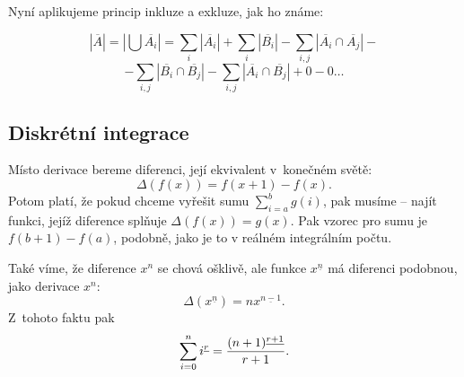 Nyní aplikujeme princip inkluze a exkluze, jak ho známe:

$$|\overline{A}| = |⋃\overline{A_i}| = ∑_i |\overline{A_i}| + ∑_i |\overline{B_i}| - ∑_{i,j}|\overline{A_i} ∩ \overline{A_j}| -$$
$$ - ∑_{i,j} |\overline{B_i} ∩ \overline{B_j}| - ∑_{i,j}|\overline{A_i} ∩ \overline{B_j}| + 0 - 0 …$$

\subsection{Diskrétní integrace}
Místo derivace bereme diferenci, její ekvivalent v~konečném světě:
$$ \Delta(f(x)) = f(x+1) - f(x).$$
Potom platí, že pokud chceme vyřešit sumu 
$ \sum_{i=a}^{b} g(i) $, pak musíme  -- najít funkci, jejíž
diference splňuje $\Delta(f(x)) = g(x)$. Pak vzorec pro sumu je $f(b+1) - f(a)$, podobně,
jako je to v reálném integrálním počtu.

Také víme, že diference $x^n$ se chová ošklivě, ale funkce $x^{\underline{n}}$ má diferenci
podobnou, jako derivace $x^n$:
$$\Delta(x^{\underline{n}}) = n x^{\underline{n-1}}.$$
Z~tohoto faktu pak
$$\sum_{i=0}^n i^{\underline{r}} = {(n+1)^{\underline{r+1}} \over r+1}.$$

\bye